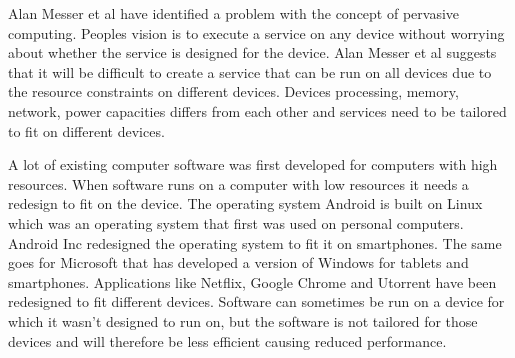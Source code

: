 Alan Messer et al \cite{alanmesser} have identified a problem with the concept of pervasive computing. Peoples vision is to execute a service on any device without worrying about whether the service is designed for the device. Alan Messer et al suggests that it will be difficult to create a service that can be run on all devices due to the resource constraints on different devices. Devices processing, memory, network, power capacities differs from each other and services need to be tailored to fit on different devices. 

A lot of existing computer software was first developed for computers with high resources. When software runs on a computer with low resources it needs a redesign to fit on the device. The operating system Android is built on Linux which was an operating system that first was used on personal computers. Android Inc redesigned the operating system to fit it on smartphones. The same goes for Microsoft that has developed a version of Windows for tablets and smartphones. Applications like Netflix, Google Chrome and Utorrent have been redesigned to fit different devices. Software can sometimes be run on a device for which it wasn't designed to run on, but the software is not tailored for those devices and will therefore be less efficient causing reduced performance.
